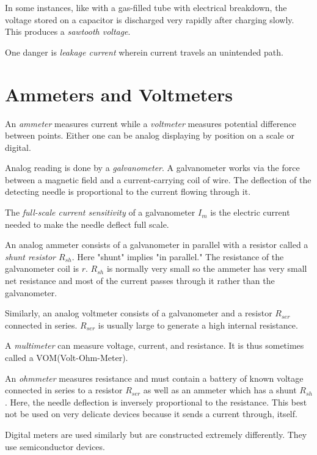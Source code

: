 \begin{definition}
    In some instances, like with a gas-filled tube with electrical breakdown, the voltage stored on a capacitor is discharged very rapidly after charging slowly. This produces a \emph{sawtooth voltage}.
\end{definition}
\begin{note}
    One danger is \emph{leakage current} wherein current travels an unintended path.
\end{note}

\section{Ammeters and Voltmeters}

\begin{definition}
    An \emph{ammeter} measures current while a \emph{voltmeter} measures potential difference between points. Either one can be analog displaying by position on a scale or digital.
\end{definition}
\begin{definition}[Galvanometer]
    Analog reading is done by a \emph{galvanometer}. A galvanometer works via the force between a magnetic field and a current-carrying coil of wire. The deflection of the detecting needle is proportional to the current flowing through it.
\end{definition}
\begin{definition}
    The \emph{full-scale current sensitivity} of a galvanometer $I_m$ is the electric current needed to make the needle deflect full scale.
\end{definition}
\begin{definition}
    An analog ammeter consists of a galvanometer in parallel with a resistor called a \emph{shunt resistor $R_{sh}$}. Here "shunt" implies "in parallel." The resistance of the galvanometer coil is $r$. $R_{sh}$ is normally very small so the ammeter has very small net resistance and most of the current passes through it rather than the galvanometer.
    
    Similarly, an analog voltmeter consists of a galvanometer and a resistor $R_{ser}$ connected in series. $R_{ser}$ is usually large to generate a high internal resistance.
\end{definition}
\begin{definition}
    A \emph{multimeter} can measure voltage, current, and resistance. It is thus sometimes called a VOM(Volt-Ohm-Meter).

    An \emph{ohmmeter} measures resistance and must contain a battery of known voltage connected in series to a resistor $R_{ser}$ as well as an ammeter which has a shunt $R_{sh}$. Here, the needle deflection is inversely proportional to the resistance. This best not be used on very delicate devices because it sends a current through, itself.
\end{definition}
\begin{note}
    Digital meters are used similarly but are constructed extremely differently. They use semiconductor devices.
\end{note}